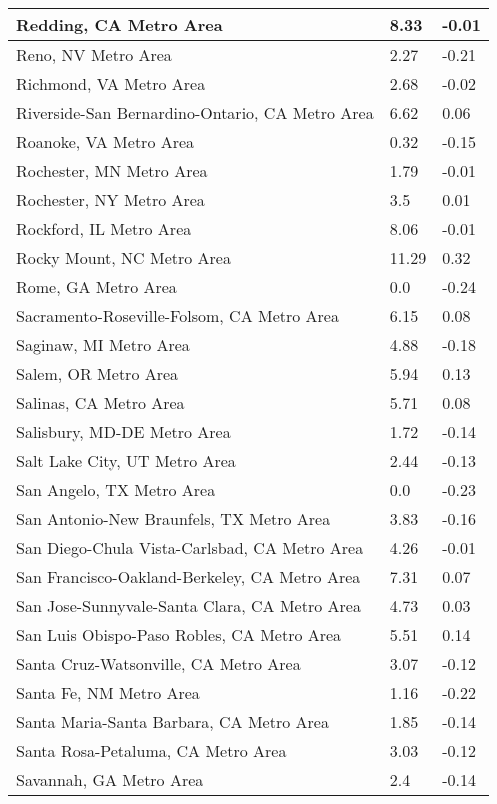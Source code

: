 \documentclass[12pt,oneside, letterpaper]{book}
\begin{document}
\begin{longtable}{| p{} | p{} | p{} |}
    Redding, CA Metro Area & 8.33 & -0.01 \\ \hline
    Reno, NV Metro Area & 2.27 & -0.21 \\ \hline
    Richmond, VA Metro Area & 2.68 & -0.02 \\ \hline
    Riverside-San Bernardino-Ontario, CA Metro Area & 6.62 & 0.06 \\ \hline
    Roanoke, VA Metro Area & 0.32 & -0.15 \\ \hline
    Rochester, MN Metro Area & 1.79 & -0.01 \\ \hline
    Rochester, NY Metro Area & 3.5 & 0.01 \\ \hline
    Rockford, IL Metro Area & 8.06 & -0.01 \\ \hline
    Rocky Mount, NC Metro Area & 11.29 & 0.32 \\ \hline
    Rome, GA Metro Area & 0.0 & -0.24 \\ \hline
    Sacramento-Roseville-Folsom, CA Metro Area & 6.15 & 0.08 \\ \hline
    Saginaw, MI Metro Area & 4.88 & -0.18 \\ \hline
    Salem, OR Metro Area & 5.94 & 0.13 \\ \hline
    Salinas, CA Metro Area & 5.71 & 0.08 \\ \hline
    Salisbury, MD-DE Metro Area & 1.72 & -0.14 \\ \hline
    Salt Lake City, UT Metro Area & 2.44 & -0.13 \\ \hline
    San Angelo, TX Metro Area & 0.0 & -0.23 \\ \hline
    San Antonio-New Braunfels, TX Metro Area & 3.83 & -0.16 \\ \hline
    San Diego-Chula Vista-Carlsbad, CA Metro Area & 4.26 & -0.01 \\ \hline
    San Francisco-Oakland-Berkeley, CA Metro Area & 7.31 & 0.07 \\ \hline
    San Jose-Sunnyvale-Santa Clara, CA Metro Area & 4.73 & 0.03 \\ \hline
    San Luis Obispo-Paso Robles, CA Metro Area & 5.51 & 0.14 \\ \hline
    Santa Cruz-Watsonville, CA Metro Area & 3.07 & -0.12 \\ \hline
    Santa Fe, NM Metro Area & 1.16 & -0.22 \\ \hline
    Santa Maria-Santa Barbara, CA Metro Area & 1.85 & -0.14 \\ \hline
    Santa Rosa-Petaluma, CA Metro Area & 3.03 & -0.12 \\ \hline
    Savannah, GA Metro Area & 2.4 & -0.14 \\ \hline

\end{longtable}
\end{document}
